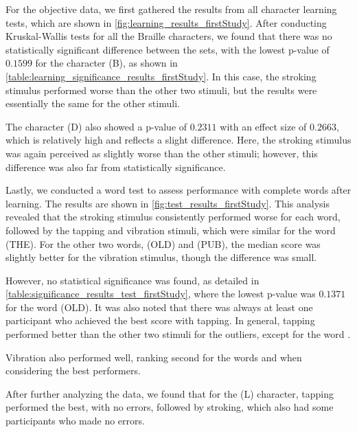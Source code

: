 
For the objective data, we first gathered the results from all character learning tests, which are shown in \autoref{fig:learning_results_firstStudy}. After conducting Kruskal-Wallis tests for all the Braille characters, we found that there was no statistically significant difference between the sets, with the lowest p-value of $0.1599$ for the character (B), as shown in \autoref{table:learning_significance_results_firstStudy}. In this case, the stroking stimulus performed worse than the other two stimuli, but the results were essentially the same for the other stimuli.

The character (D) also showed a p-value of $0.2311$ with an effect size of $0.2663$, which is relatively high and reflects a slight difference. Here, the stroking stimulus was again perceived as slightly worse than the other stimuli; however, this difference was also far from statistically significance.


Lastly, we conducted a word test to assess performance with complete words after learning. The results are shown in \autoref{fig:test_results_firstStudy}. This analysis revealed that the stroking stimulus consistently performed worse for each word, followed by the tapping and vibration stimuli, which were similar for the word  (THE). For the other two words,  (OLD) and  (PUB), the median score was slightly better for the vibration stimulus, though the difference was small.

However, no statistical significance was found, as detailed in \autoref{table:significance_results_test_firstStudy}, where the lowest p-value was $0.1371$ for the word  (OLD). It was also noted that there was always at least one participant who achieved the best score with tapping. In general, tapping performed better than the other two stimuli for the outliers, except for the word .

Vibration also performed well, ranking second for the words  and  when considering the best performers.


After further analyzing the data, we found that for the  (L) character, tapping performed the best, with no errors, followed by stroking, which also had some participants who made no errors.

